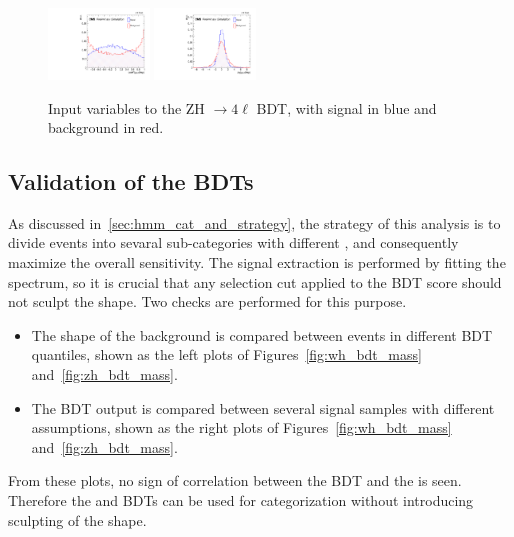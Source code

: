 \begin{figure}[!htb]
    \includegraphics[width=0.24\textwidth]{pics/VH_sec/BDT_train_ZH/BDT_cts_dipair_H.pdf}           
    \includegraphics[width=0.24\textwidth]{pics/VH_sec/BDT_train_ZH/BDT_dipair_dEta_H.pdf}

    \caption{Input variables to the ZH $\to 4\ell$ BDT, with signal in blue and background in red.}
    \label{fig:zh_bdt_vars}
\end{figure}


\clearpage
\subsection{Validation of the BDTs}\label{subsec:bdt_validation}

As discussed in~\ref{sec:hmm_cat_and_strategy}, the strategy of this analysis is to divide events into sevaral sub-categories with different \SoB,
and consequently maximize the overall sensitivity.
The signal extraction is performed by fitting the \mmm spectrum, so it is crucial that 
any selection cut applied to the BDT score should not sculpt the \mmm shape.
Two checks are performed for this purpose.
\begin{itemize}
	\item The \mmm shape of the background is compared between events in different BDT quantiles, shown as the left plots of Figures~\ref{fig:wh_bdt_mass} and~\ref{fig:zh_bdt_mass}. 
	\item The BDT output is compared between several signal samples with different \mh assumptions, shown as the right plots of Figures~\ref{fig:wh_bdt_mass} and~\ref{fig:zh_bdt_mass}.
\end{itemize}
From these plots, no sign of correlation between the BDT and the \mmm is seen. 
Therefore the \WH and \ZH BDTs can be used for categorization without introducing sculpting of the \mmm shape.

